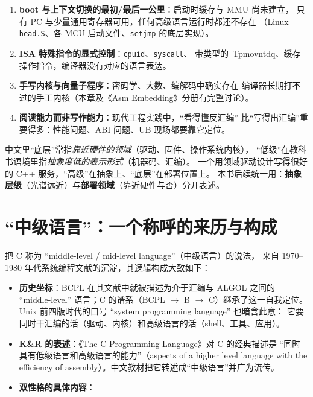 \documentclass[12pt,a4paper,fontset=fandol]{ctexbook}
\newcommand{\Tp}[1]{\texttt{#1}}
\begin{document}
\begin{enumerate}[label=\textbf{\arabic*.}]
  \item \textbf{boot 与上下文切换的最初/最后一公里}：启动时缓存与 MMU 尚未建立，
        只有 PC 与少量通用寄存器可用，任何高级语言运行时都还不存在
        （Linux \Tp{head.S}、各 MCU 启动文件、\Tp{setjmp} 的底层实现）。
  \item \textbf{ISA 特殊指令的显式控制}：\texttt{cpuid}、\texttt{syscall}、
        带类型的\ Tp{movntdq}、缓存操作指令，编译器没有对应的语言表达。
  \item \textbf{手写内核与向量子程序}：密码学、大数、编解码中确实存在
        编译器长期打不过的手工内核（本章及《Asm Embedding》分册有完整讨论）。
  \item \textbf{阅读能力而非写作能力}：现代工程实践中，``看得懂反汇编''
        比``写得出汇编''重要得多：性能问题、ABI 问题、UB 现场都要靠它定位。
\end{enumerate}

\begin{compare}[title=``低级语言''与``底层''是两个不同的词]
中文里``底层''常指\emph{靠近硬件的领域}（驱动、固件、操作系统内核），
``低级''在教科书语境里指\emph{抽象度低的表示形式}（机器码、汇编）。
一个用领域驱动设计写得很好的 C++ 服务，``高级''在抽象上、``底层''在部署位置上。
本书后续统一用：\textbf{抽象层级}（光谱远近）与\textbf{部署领域}（靠近硬件与否）分开表述。
\end{compare}

\section{``中级语言''：一个称呼的来历与构成}

把 C 称为 ``middle-level / mid-level language''（中级语言）的说法，
来自 1970--1980 年代系统编程文献的沉淀，其逻辑构成大致如下：

\begin{itemize}
  \item \textbf{历史坐标}：BCPL 在其文献中就被描述为介于汇编与 ALGOL 之间的
        ``middle-level'' 语言；C 的谱系（BCPL $\to$ B $\to$ C）继承了这一自我定位。
        Unix 前四版时代的口号 ``system programming language'' 也暗含此意：
        它要同时干汇编的活（驱动、内核）和高级语言的活（shell、工具、应用）。
  \item \textbf{K\&R 的表述}：《The C Programming Language》对 C 的经典描述是
        ``同时具有低级语言和高级语言的能力''（aspects of a higher level language
        with the efficiency of assembly）。中文教材把它转述成``中级语言''并广为流传。
  \item \textbf{双性格的具体内容}：
\end{itemize}
\end{document}
